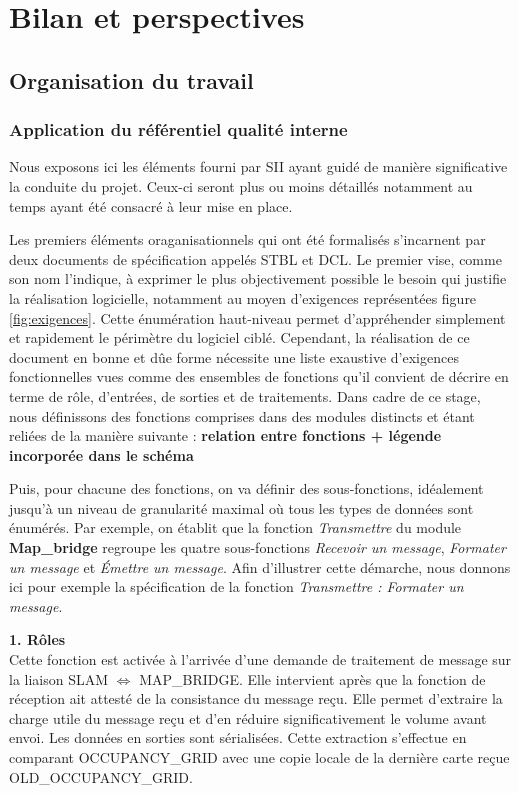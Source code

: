 \chapter{Bilan et perspectives}
\label{chap:bilan}

\section{Organisation du travail}
\label{sec:orga}
  \subsection{Application du référentiel qualité interne}
  
  Nous exposons ici les éléments fourni par SII ayant guidé de manière significative la conduite du projet. 
  Ceux-ci seront plus ou moins détaillés notamment au temps ayant été consacré à leur mise en place.
  
  Les premiers éléments oraganisationnels qui ont été formalisés s'incarnent par deux documents de spécification appelés \gls{STBL} et \gls{DCL}.
  Le premier vise, comme son nom l'indique, à exprimer le plus objectivement possible le besoin qui justifie la réalisation logicielle, notamment au moyen d'exigences représentées figure \ref{fig:exigences}. 
  Cette énumération haut-niveau permet d'appréhender simplement et rapidement le périmètre du logiciel ciblé. 
  Cependant, la réalisation de ce document en bonne et dûe forme nécessite une liste exaustive d'exigences fonctionnelles vues comme des ensembles de fonctions qu'il convient de décrire en terme de rôle, d'entrées, de sorties et
  de traitements. 
  Dans cadre de ce stage, nous définissons des fonctions comprises dans des modules distincts et étant reliées de la manière suivante : \textbf{relation entre fonctions + légende incorporée dans le schéma}
  
  
  Puis, pour chacune des fonctions, on va définir des sous-fonctions, idéalement jusqu'à un niveau de granularité maximal où tous les types de données sont énumérés. 
  Par exemple, on établit que la fonction \emph{Transmettre} du module \textbf{\textcolor{red-stbl}{Map\_bridge}} regroupe les quatre sous-fonctions \emph{Recevoir un message}, \emph{Formater un message} et \emph{\'{E}mettre un message}. 
  Afin d'illustrer cette démarche, nous donnons ici pour exemple la spécification de la fonction \emph{Transmettre : Formater un message}. 
  
  \textbf{1. Rôles } \\
  Cette fonction est activée à l’arrivée d’une demande de traitement de message sur la liaison SLAM $\Longleftrightarrow{}$ MAP\_BRIDGE.
  Elle intervient après que la fonction de réception ait attesté de la consistance du message reçu.
  Elle permet d’extraire la charge utile du message reçu et d’en réduire significativement le volume avant envoi.  Les données en sorties sont sérialisées.
  Cette extraction s’effectue en comparant OCCUPANCY\_GRID avec une copie locale de la dernière carte reçue OLD\_OCCUPANCY\_GRID.
  
